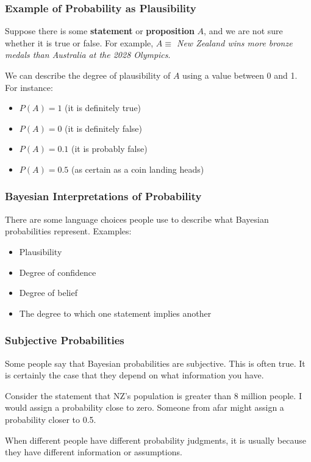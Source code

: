 \documentclass{beamer}
\begin{document}
\begin{frame}
\frametitle{Example of Probability as Plausibility}
Suppose there is some {\bf statement}
or {\bf proposition} $A$, and we are not sure whether it is true or
false. For example, {\em $A \equiv$ New Zealand wins more bronze medals than
Australia at the 2028 Olympics}.\pause

We can describe the degree of plausibility of $A$ using a value between 0 and 1.
For instance:
\begin{itemize}
\item $P(A) = 1$ (it is definitely true) \\
\item $P(A) = 0$ (it is definitely false) \\
\item $P(A) = 0.1$ (it is probably false) \\
\item $P(A) = 0.5$ (as certain as a coin landing heads)
\end{itemize}

\end{frame}


\begin{frame}
\frametitle{Bayesian Interpretations of Probability}
There are some language choices people use to describe what
Bayesian probabilities represent. Examples:\pause

\begin{itemize}
\item Plausibility \pause
\item Degree of confidence \pause
\item Degree of belief \pause
\item The degree to which one statement implies another
\end{itemize}

\end{frame}



\begin{frame}
\frametitle{Subjective Probabilities}
Some people say that Bayesian probabilities are subjective.
This is often true. It is certainly the case
that they depend on what information you have.\\[0.3em]\pause

Consider the statement that NZ's population is greater than 8
million people. I would assign a probability close to zero.
Someone from afar might assign a probability closer to 0.5.\\[0.3em]\pause

When different people have different probability judgments,
it is usually because they have different information or assumptions.

\end{frame}
\end{document}
